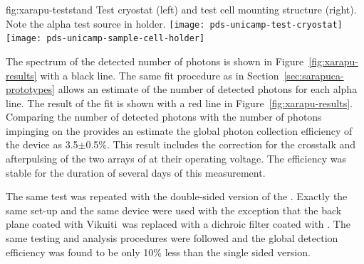 \begin{dunefigure}{fig:xarapu-teststand}
{Test cryostat (left) and  test cell mounting structure (right).  Note the alpha test source in holder.} 
	\texttt{[image: pds-unicamp-test-cryostat]} \quad
	\texttt{[image: pds-unicamp-sample-cell-holder]}
\end{dunefigure}  


The spectrum of the detected number of photons is shown in Figure~\ref{fig:xarapu-results} with a black line. The same fit procedure as in Section~\ref{sec:sarapuca-prototypes} allows an estimate of the number of detected photons for each alpha line. The result of the fit is shown with a red line in Figure~\ref{fig:xarapu-results}. Comparing the number of detected photons with the number of photons impinging on the  provides an estimate the global photon collection efficiency of the device as 3.5$\pm$0.5\%.
This result includes the correction for the crosstalk and afterpulsing of the two arrays of  at their operating voltage.
The efficiency was stable for the duration of several days of this measurement.

The same test was repeated with the double-sided version of the . Exactly the same set-up and the same device were used with the exception that the back plane coated with Vikuiti\texttrademark\ was replaced with a dichroic filter coated with . The same testing and analysis procedures were followed and the global detection efficiency was found to be only 10\% less than the single sided version.   

